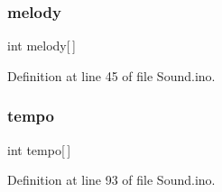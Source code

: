 \subsubsection{\texorpdfstring{melody}{melody}}
{\footnotesize\ttfamily int melody\mbox{[}$\,$\mbox{]}}



Definition at line 45 of file Sound.\+ino.

\mbox{\label{_sound_8ino_a6f6d5c0ba161267c02217acec1d2748d}} 
\subsubsection{\texorpdfstring{tempo}{tempo}}
{\footnotesize\ttfamily int tempo\mbox{[}$\,$\mbox{]}}



Definition at line 93 of file Sound.\+ino.

